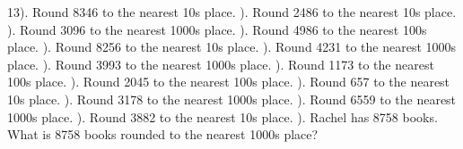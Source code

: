 \documentclass{article}%
\begin{document}
13). Round 8346 to the nearest 10s place.%
\newline%
\newline%
). Round 2486 to the nearest 10s place.%
\newline%
\newline%
). Round 3096 to the nearest 1000s place.%
\newline%
\newline%
). Round 4986 to the nearest 100s place.%
\newline%
\newline%
). Round 8256 to the nearest 10s place.%
\newline%
\newline%
). Round 4231 to the nearest 1000s place.%
\newline%
\newline%
). Round 3993 to the nearest 1000s place.%
\newline%
\newline%
). Round 1173 to the nearest 100s place.%
\newline%
\newline%
). Round 2045 to the nearest 100s place.%
\newline%
\newline%
). Round 657 to the nearest 10s place.%
\newline%
\newline%
). Round 3178 to the nearest 1000s place.%
\newline%
\newline%
). Round 6559 to the nearest 1000s place.%
\newline%
\newline%
). Round 3882 to the nearest 10s place.%
\newline%
\newline%
). Rachel has 8758 books. What is 8758 books rounded to the nearest 1000s place?%
\end{document}
